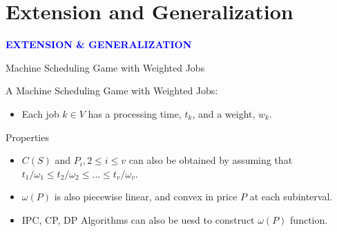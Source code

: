 \documentclass[14pt]{beamer}
\begin{document}
\section{Extension and Generalization}
\begin{frame}
\centering
\large
\textcolor{blue}{\bf {\huge E}XTENSION \&  {\huge G}ENERALIZATION}
\end{frame}

\begin{frame}{Machine Scheduling Game with Weighted Jobs}
	\begin{definition}
	\small
	\justifying
	A Machine Scheduling Game with Weighted Jobs:\\
	\begin{itemize}
		\justifying
			\item Each job $k \in V$ has a processing time, $t_k$, and a weight, $w_k$.
	\end{itemize}
	\end{definition}

	\begin{block}
		{Properties}
		\begin{itemize}
			\justifying
			\small
				\item $C(S)$ and $P_i, 2 \leq i \leq v$ can also be obtained by assuming that\\
				\quad $t_1/\omega_1 \leq t_2/\omega_2 \leq \ldots \leq t_v/\omega_v$.
				\vspace{2pt}
				\item ${\omega(P)}$ is also piecewise linear, and convex in price $P$ at each subinterval.
				\item IPC, CP, DP Algorithms can also be uesd to construct $\omega(P)$ function.
		\end{itemize}
	\end{block}

\end{frame}
\end{document}
